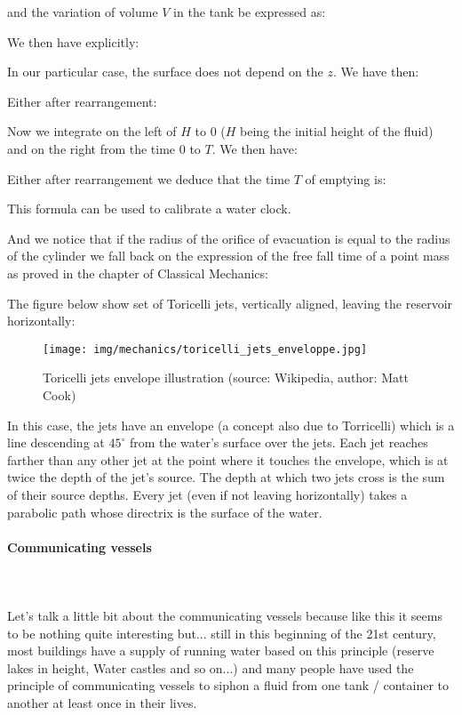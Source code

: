 	and the variation of volume $V$ in the tank be expressed as:
	
	We then have explicitly:
	
	In our particular case, the surface does not depend on the $z$. We have then:
	
	Either after rearrangement:
	
	Now we integrate on the left of $H$ to $0$ ($H$ being the initial height of the fluid) and on the right from the time $0$ to $T$. We then have:
	
	Either after rearrangement we deduce that the time $T$ of emptying is:
	
	This formula can be used to calibrate a water clock.

	And we notice that if the radius of the orifice of evacuation is equal to the radius of the cylinder we fall back on the expression of the free fall time of a point mass as proved in the chapter of Classical Mechanics:
	
	The figure below show set of Toricelli jets, vertically aligned, leaving the reservoir horizontally:
	\begin{figure}[H]
		\centering
		\texttt{[image: img/mechanics/toricelli\_jets\_enveloppe.jpg]}
		\caption{Toricelli jets envelope illustration (source: Wikipedia, author: Matt Cook)}
	\end{figure}
	In this case, the jets have an envelope (a concept also due to Torricelli) which is a line descending at $45^\circ$ from the water's surface over the jets. Each jet reaches farther than any other jet at the point where it touches the envelope, which is at twice the depth of the jet's source. The depth at which two jets cross is the sum of their source depths. Every jet (even if not leaving horizontally) takes a parabolic path whose directrix is the surface of the water.
	
	\pagebreak
	\paragraph{Communicating vessels}\mbox{}\\\\
	Let's talk a little bit about the communicating vessels because like this it seems to be nothing quite interesting but... still in this beginning of the 21st century, most buildings have a supply of running water based on this principle (reserve lakes in height, Water castles and so on...) and many people have used the principle of communicating vessels to siphon a fluid from one tank / container to another at least once in their lives.


